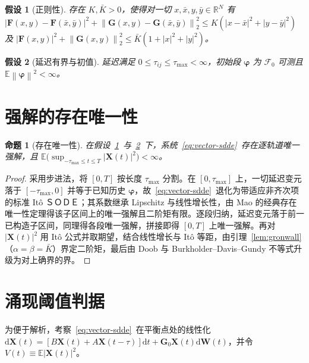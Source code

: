 \documentclass[12pt,a4paper]{ctexart}
\newcommand{\kai}[1]{{\CJKfamily{kai}#1}}
\newtheorem{proposition}{命题}
\newtheorem{assumption}{假设}
\newcommand{\R}{\mathbb{R}}
\newcommand{\E}{\mathbb{E}}
\newcommand{\dd}{\mathrm{d}}
\newcommand{\norm}[1]{\left\lVert #1 \right\rVert}
\newcommand{\abs}[1]{\left\lvert #1 \right\rvert}
\newcommand{\X}{\mathbf{X}}
\newcommand{\W}{\mathbf{W}}
\newcommand{\F}{\mathbf{F}}
\newcommand{\G}{\mathbf{G}}
\begin{document}
\begin{assumption}[正则性]\label{ass:lip}
存在 $K,\bar K>0$，使得对一切 $x,\bar x,y,\bar y\in\R^N$ 有 $\abs{\F(x,y)-\F(\bar x,\bar y)}^2+\norm{\G(x,y)-\G(\bar x,\bar y)}_2^2\le K(\abs{x-\bar x}^2+\abs{y-\bar y}^2)$ 及 $\abs{\F(x,y)}^2+\norm{\G(x,y)}_2^2\le\bar K(1+\abs{x}^2+\abs{y}^2)$。
\end{assumption}

\begin{assumption}[延迟有界与初值]\label{ass:delay}
延迟满足 $0\le\tau_{ij}\le\tau_{\max}<\infty$，初始段 $\bm{\varphi}$ 为 $\mathcal{F}_0$ 可测且 $\E\norm{\bm{\varphi}}^2<\infty$。
\end{assumption}

\section{强解的存在唯一性}\label{sec:existence}

\begin{proposition}[存在唯一性]\label{prop:existence}
在假设~\ref{ass:lip}~与~\ref{ass:delay}~下，系统~\eqref{eq:vector-sdde}~存在逐轨道唯一强解，且 $\E\bigl(\sup_{-\tau_{\max}\le t\le T}\abs{\X(t)}^2\bigr)<\infty$。
\end{proposition}

\begin{proof}
采用\kai{步进法}，将 $[0,T]$ 按长度 $\tau_{\max}$ 分割。在 $[0,\tau_{\max}]$ 上，一切延迟变元落于 $[-\tau_{\max},0]$ 并等于已知历史 $\bm{\varphi}$，故~\eqref{eq:vector-sdde}~退化为带适应非齐次项的标准 Itô ＳＯＤＥ；其系数继承 Lipschitz 与线性增长性，由 Mao 的经典存在唯一性定理得该子区间上的唯一强解且二阶矩有限。逐段归纳，延迟变元落于前一已构造子区间，同理得各段唯一强解，拼接即得 $[0,T]$ 上唯一强解。再对 $\abs{\X(t)}^2$ 用 Itô 公式并取期望，结合线性增长与 Itô 等距，由引理~\ref{lem:gronwall}（$\alpha=\beta=\bar K$）界定二阶矩，最后由 Doob 与 Burkholder–Davis–Gundy 不等式升级为对上确界的界。
\end{proof}

\section{涌现阈值判据}\label{sec:threshold}

\hspace{2em}为便于解析，考察~\eqref{eq:vector-sdde}~在平衡点处的线性化 $\dd\X(t)=[B\X(t)+A\X(t-\tau)]\dd t+\G_0\X(t)\dd\W(t)$，并令 $V(t)\equiv\E\abs{\X(t)}^2$。
\end{document}
